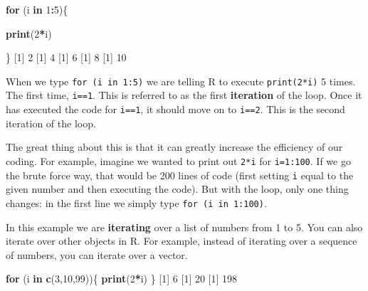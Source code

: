 \documentclass[
]{book}
\newenvironment{Shaded}{\begin{snugshade}}{\end{snugshade}}
\newcommand{\ControlFlowTok}[1]{\textcolor[rgb]{0.13,0.29,0.53}{\textbf{#1}}}
\newcommand{\DecValTok}[1]{\textcolor[rgb]{0.00,0.00,0.81}{#1}}
\newcommand{\FunctionTok}[1]{\textcolor[rgb]{0.13,0.29,0.53}{\textbf{#1}}}
\newcommand{\NormalTok}[1]{#1}
\newcommand{\SpecialCharTok}[1]{\textcolor[rgb]{0.81,0.36,0.00}{\textbf{#1}}}
\begin{document}
\begin{Shaded}
\begin{Highlighting}[]
\ControlFlowTok{for}\NormalTok{ (i }\ControlFlowTok{in} \DecValTok{1}\SpecialCharTok{:}\DecValTok{5}\NormalTok{)\{}
  
  \FunctionTok{print}\NormalTok{(}\DecValTok{2}\SpecialCharTok{*}\NormalTok{i)}

\NormalTok{\}}
\NormalTok{[}\DecValTok{1}\NormalTok{] }\DecValTok{2}
\NormalTok{[}\DecValTok{1}\NormalTok{] }\DecValTok{4}
\NormalTok{[}\DecValTok{1}\NormalTok{] }\DecValTok{6}
\NormalTok{[}\DecValTok{1}\NormalTok{] }\DecValTok{8}
\NormalTok{[}\DecValTok{1}\NormalTok{] }\DecValTok{10}
\end{Highlighting}
\end{Shaded}

When we type \texttt{for\ (i\ in\ 1:5)} we are telling R to execute \texttt{print(2*i)} 5 times. The first time, \texttt{i==1}. This is referred to as the first \textbf{iteration} of the loop. Once it has executed the code for \texttt{i==1}, it should move on to \texttt{i==2}. This is the second iteration of the loop.

The great thing about this is that it can greatly increase the efficiency of our coding. For example, imagine we wanted to print out \texttt{2*i} for \texttt{i=1:100}. If we go the brute force way, that would be 200 lines of code (first setting \texttt{i} equal to the given number and then executing the code). But with the loop, only one thing changes: in the first line we simply type \texttt{for\ (i\ in\ 1:100)}.

In this example we are \textbf{iterating} over a list of numbers from 1 to 5. You can also iterate over other objects in R. For example, instead of iterating over a sequence of numbers, you can iterate over a vector.

\begin{Shaded}
\begin{Highlighting}[]
\ControlFlowTok{for}\NormalTok{ (i }\ControlFlowTok{in} \FunctionTok{c}\NormalTok{(}\DecValTok{3}\NormalTok{,}\DecValTok{10}\NormalTok{,}\DecValTok{99}\NormalTok{))\{}
  \FunctionTok{print}\NormalTok{(}\DecValTok{2}\SpecialCharTok{*}\NormalTok{i)}
\NormalTok{\}}
\NormalTok{[}\DecValTok{1}\NormalTok{] }\DecValTok{6}
\NormalTok{[}\DecValTok{1}\NormalTok{] }\DecValTok{20}
\NormalTok{[}\DecValTok{1}\NormalTok{] }\DecValTok{198}
\end{Highlighting}
\end{Shaded}
\end{document}
